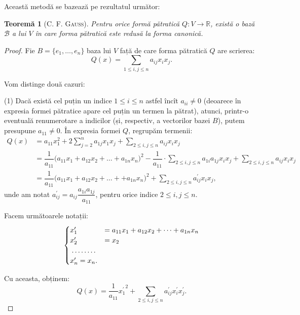 \documentclass[11pt,a4paper]{article}
\theoremstyle{dotless}
\newtheorem{theorem}{Teorem\u{a}}[section]
\theoremstyle{dotlessdr}
\begin{document}
\indent\indent Această metodă se bazează pe rezultatul următor:

\begin{theorem}[\textsc{C. F. Gauss}]
	Pentru orice formă pătratică $Q : V \to \mathbb{R}$, există o bază 
$\mathcal{B}$ a lui $V$ în care forma pătratică este redusă la forma canonică.
\end{theorem}

\begin{proof}
	Fie $B = \{e_1, \dots, e_n\}$ baza lui $V$ față de care forma pătratică $Q$
are scrierea: 
 \[
	Q(x) = \sum_{1 \leq i, j \leq n} a_{ij} x_i x_j.
\]

Vom distinge două cazuri:

(1) Dacă există cel puțin un indice $1 \leq i \leq n$ astfel încît 
$a_{ii} \neq 0$ (deoarece în expresia formei pătratice apare cel puțin un termen
la pătrat), atunci, printr-o eventuală renumerotare a indicilor (și, respectiv,
a vectorilor bazei $B$), putem presupune $a_{11} \neq 0$. În expresia formei
$Q$, regrupăm termenii:
\begin{align*}
Q(x) &= a_{11}x_1^2 + 2 \sum_{j = 2}^n a_{1j} x_1 x_j + 
                        \sum_{2 \leq i,j \leq n} a_{ij} x_i x_j \\
     &= \dfrac{1}{a_{11}} \big( a_{11} x_1 + a_{12} x_2 + \dots +
                  a_{1n} x_n \big)^2 - \dfrac{1}{a_{11}} \cdot
                  \sum_{2 \leq i, j \leq n} a_{1i} a_{1j} x_i x_j +
                  \sum_{2 \leq i, j \leq n} a_{ij} x_i x_j \\
     &= \dfrac{1}{a_{11}} \big( a_{11} x_1 + a_{12} x_2 + \dots +
                            + a_{1n} x_n \big)^2 +
                        \sum_{2 \leq i, j \leq n} a^{\prime}_{ij} x_i x_j,
\end{align*}
unde am notat $a^{\prime}_{ij} = a_{ij} \dfrac{a_{1i} a_{1j}}{a_{11}}$, pentru
orice indice $2 \leq i, j \leq n$.

Facem următoarele notații: 
 \[
	\begin{cases}	
	    x^{\prime}_1 &= a_{11}x_1 + a_{12} x_2 + \dots + a_{1n} x_n \\
	    x^{\prime}_2 &= x_2 \\
	    \dotfill \\
	    x^{\prime}_n = x_n.
    \end{cases}
\]

Cu aceasta, obținem: 
 \[
	Q(x) = \dfrac{1}{a_{11}} {x_1^{\prime}}^2 + 
	        \sum_{2 \leq i,j \leq n} a^{\prime}_{ij} x^{\prime}_i x^{\prime}_j.
\]


\end{proof}
\end{document}

